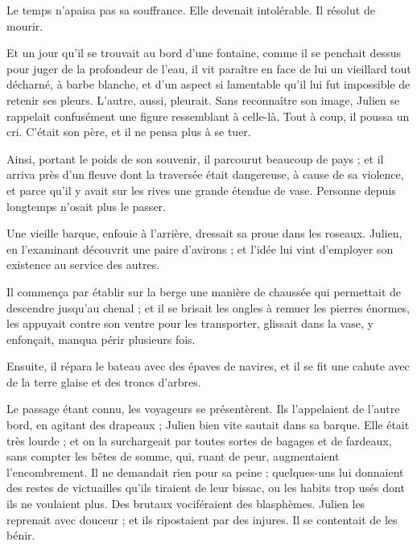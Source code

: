 \documentclass[]{book}
\begin{document}
                Le temps n'apaisa pas sa souffrance. Elle devenait intolérable. Il résolut de mourir.
                    
                Et un jour qu'il se trouvait au bord d'une fontaine, comme il se penchait dessus pour juger de la profondeur de l'eau, il vit paraître en face de lui un vieillard tout décharné, à barbe blanche, et d'un aspect si lamentable qu'il lui fut impossible de retenir ses pleurs. L'autre, aussi, pleurait. Sans reconnaître son image, Julien se rappelait confusément une figure ressemblant à celle-là. Tout à coup, il poussa un cri. C'était son père, et il ne pensa plus à se tuer.
                    
                Ainsi, portant le poids de son souvenir, il parcourut beaucoup de pays ; et il arriva près d'un fleuve dont la traversée était dangereuse, à cause de sa violence, et parce qu'il y avait sur les rives une grande étendue de vase. Personne depuis longtemps n'osait plus le passer.
                    
                Une vieille barque, enfouie à l'arrière, dressait sa proue dans les roseaux. Julien, en l'examinant découvrit une paire d'avirons ; et l'idée lui vint d'employer son existence au service des autres.
                    
                Il commença par établir sur la berge une manière de chaussée qui permettait de descendre jusqu'au chenal ; et il se brisait les ongles à remuer les pierres énormes, les appuyait contre son ventre pour les transporter, glissait dans la vase, y enfonçait, manqua périr plusieurs fois.
                    
                Ensuite, il répara le bateau avec des épaves de navires, et il se fit une cahute avec de la terre glaise et des troncs d'arbres.
                    
                Le passage étant connu, les voyageurs se présentèrent. Ils l'appelaient de l'autre bord, en agitant des drapeaux ; Julien bien vite sautait dans sa barque. Elle était très lourde ; et on la surchargeait par toutes sortes de bagages et de fardeaux, sans compter les bêtes de somme, qui, ruant de peur, augmentaient l'encombrement. Il ne demandait rien pour sa peine ; quelques-uns lui donnaient des restes de victuailles qu'ils tiraient de leur bissac, ou les habits trop usés dont ils ne voulaient plus. Des brutaux vociféraient des blasphèmes. Julien les reprenait avec douceur ; et ils ripostaient par des injures. Il se contentait de les bénir.
                    
\end{document}
